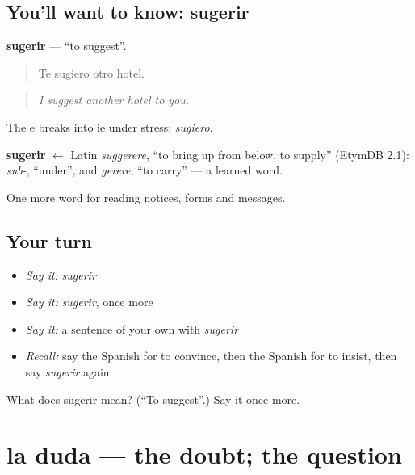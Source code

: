 \subsection*{You'll want to know: sugerir}
\textbf{sugerir} — \textquotedblleft{}to suggest\textquotedblright{}.

\begin{quote}
Te sugiero otro hotel.
\end{quote}

\begin{quote}
\emph{I suggest another hotel to you.}
\end{quote}

The e breaks into ie under stress: \emph{sugiero}.

\begin{cousinweb}
\textbf{sugerir} $\leftarrow$ Latin \emph{suggerere}, \textquotedblleft{}to bring up from below, to supply\textquotedblright{} (EtymDB 2.1): \emph{sub-}, \textquotedblleft{}under\textquotedblright{}, and \emph{gerere}, \textquotedblleft{}to carry\textquotedblright{} — a learned word.
\end{cousinweb}

\begin{grammarlens}[title={What you've built}]
One more word for reading notices, forms and messages.
\end{grammarlens}

\subsection*{Your turn}
\begin{itemize}
\raggedright
  \item \emph{Say it:} \emph{sugerir}
  \item \emph{Say it:} \emph{sugerir}, once more
  \item \emph{Say it:} a sentence of your own with \emph{sugerir}
  \item \emph{Recall:} say the Spanish for to convince, then the Spanish for to insist, then say \emph{sugerir} again
\end{itemize}

\begin{tcolorbox}[breakable,colback=teal!4,colframe=teal!35!black,title={Before you move on}]
What does sugerir mean? (\textquotedblleft{}To suggest\textquotedblright{}.) Say it once more.
\end{tcolorbox}
\section[la duda]{la duda — the doubt; the question}

